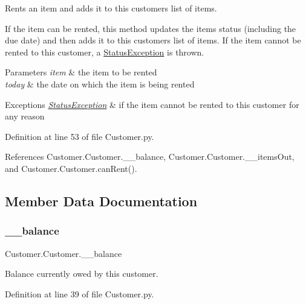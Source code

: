 Rents an item and adds it to this customer\textquotesingle{}s list of items. 

If the item can be rented, this method updates the item\textquotesingle{}s status (including the due date) and then adds it to this customer\textquotesingle{}s list of items. If the item cannot be rented to this customer, a \hyperlink{namespaceStatusException}{Status\+Exception} is thrown. 
\begin{DoxyParams}{Parameters}
{\em item} & the item to be rented \\
\hline
{\em today} & the date on which the item is being rented \\
\hline
\end{DoxyParams}

\begin{DoxyExceptions}{Exceptions}
{\em \hyperlink{namespaceStatusException}{Status\+Exception}} & if the item cannot be rented to this customer for any reason \\
\hline
\end{DoxyExceptions}


Definition at line 53 of file Customer.\+py.



References Customer.\+Customer.\+\_\+\+\_\+balance, Customer.\+Customer.\+\_\+\+\_\+items\+Out, and Customer.\+Customer.\+can\+Rent().



\subsection{Member Data Documentation}
\mbox{\label{classCustomer_1_1Customer_a3fe2716ffce15422d3bebc6989a1353d}} 
\subsubsection{\texorpdfstring{\+\_\+\+\_\+balance}{\_\_balance}}
{\footnotesize\ttfamily Customer.\+Customer.\+\_\+\+\_\+balance\hspace{0.3cm}{\ttfamily [private]}}



Balance currently owed by this customer. 



Definition at line 39 of file Customer.\+py.



